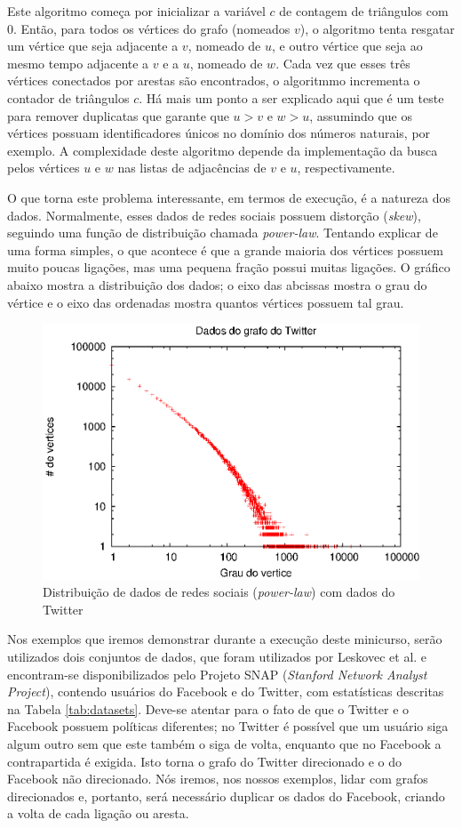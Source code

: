 Este algoritmo começa por inicializar a variável $c$ de contagem de triângulos com $0$. Então, para
todos os vértices do grafo (nomeados $v$), o algoritmo tenta resgatar um vértice que seja adjacente a 
$v$, nomeado de $u$, e outro vértice que seja ao mesmo tempo adjacente a $v$ e a $u$, nomeado de $w$.
Cada vez que esses três vértices conectados por arestas são encontrados, o algoritmmo incrementa o 
contador de triângulos $c$. Há mais um ponto a ser explicado aqui que é um teste para remover duplicatas
que garante que $u>v$ e $w>u$, assumindo que os vértices possuam identificadores únicos no domínio dos
números naturais, por exemplo. A complexidade deste algoritmo depende da implementação da busca pelos 
vértices $u$ e $w$ nas listas de adjacências de $v$ e $u$, respectivamente.

O que torna este problema interessante, em termos de execução, é a natureza dos dados. Normalmente, esses
dados de redes sociais possuem distorção (\emph{skew}), seguindo uma função de distribuição chamada 
\emph{power-law}. Tentando explicar de uma forma simples, o que acontece é que a grande maioria dos 
vértices possuem muito poucas ligações, mas uma pequena fração possui muitas ligações. O gráfico abaixo 
mostra a distribuição dos dados; o eixo das abcissas mostra o grau do vértice e o eixo das ordenadas 
mostra quantos vértices possuem tal grau.

\begin{figure}[!htbp]
	\centerline{\includegraphics[width=0.7\linewidth]{power_law.eps}}
	\caption{Distribuição de dados de redes sociais (\emph{power-law}) com dados do Twitter}
	\label{fig:powerlaw}
\end{figure}

Nos exemplos que iremos demonstrar durante a execução deste minicurso, serão utilizados dois conjuntos
de dados, que foram utilizados por Leskovec et al. \cite{leskovec2012learning} e encontram-se 
disponibilizados pelo Projeto SNAP (\textit{Stanford Network Analyst Project}), contendo
usuários do Facebook e do Twitter, com estatísticas descritas na Tabela \ref{tab:datasets}.
Deve-se atentar para o fato de que o Twitter e o Facebook possuem políticas diferentes; no Twitter
é possível que um usuário siga algum outro sem que este também o siga de volta, enquanto que
no Facebook a contrapartida é exigida. Isto torna o grafo do Twitter direcionado e o do Facebook
não direcionado. Nós iremos, nos nossos exemplos, lidar com grafos direcionados e, portanto, será
necessário duplicar os dados do Facebook, criando a volta de cada ligação ou aresta.

